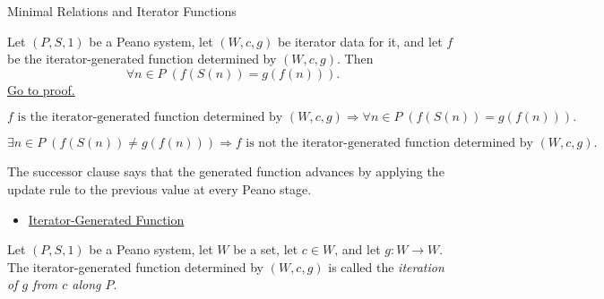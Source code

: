 \begin{topicbox}{Minimal Relations and Iterator Functions}
\begin{tcolorbox}[colback=thmbox, colframe=thmborder, arc=2pt,
  left=6pt, right=6pt, top=4pt, bottom=4pt,
  title={\small\textbf{Theorem (Iterator Successor Clause)}},
  fonttitle=\small\bfseries]
\begin{theorem}
\label{thm:iterator-successor-step}
Let $(P,S,1)$ be a Peano system, let $(W,c,g)$ be iterator data for it, and let
$f$ be the iterator-generated function determined by $(W,c,g)$. Then
\[
\forall n\in P\;(f(S(n))=g(f(n))).
\]
\hyperref[prf:iterator-successor-step]{Go to proof.}
\end{theorem}
\end{tcolorbox}

\begin{remark*}
\[
f \text{ is the iterator-generated function determined by } (W,c,g)
\Longrightarrow
\forall n\in P\;(f(S(n))=g(f(n))).
\]
\end{remark*}


\begin{remark*}
\[
\exists n\in P\;(f(S(n))\neq g(f(n)))
\Longrightarrow
f \text{ is not the iterator-generated function determined by } (W,c,g).
\]
\end{remark*}

\begin{remark*}[Interpretation]
The successor clause says that the generated function advances by applying
the update rule to the previous value at every Peano stage.
\end{remark*}

\begin{remark*}[Dependencies]
\begin{itemize}
  \item \hyperref[def:iterator-generated-function]{Iterator-Generated Function}
\end{itemize}
\end{remark*}

\begin{tcolorbox}[colback=defbox, colframe=defborder, arc=2pt,
  left=6pt, right=6pt, top=4pt, bottom=4pt,
  title={\small\textbf{Definition (Iteration of a Self-Map)}},
  fonttitle=\small\bfseries]
\begin{definition}
\label{def:iteration-of-a-self-map}
Let $(P,S,1)$ be a Peano system, let $W$ be a set, let $c\in W$, and let
$g:W\to W$. The iterator-generated function determined by $(W,c,g)$ is called
the \emph{iteration of $g$ from $c$ along $P$}.
\end{definition}
\end{tcolorbox}


\end{topicbox}

